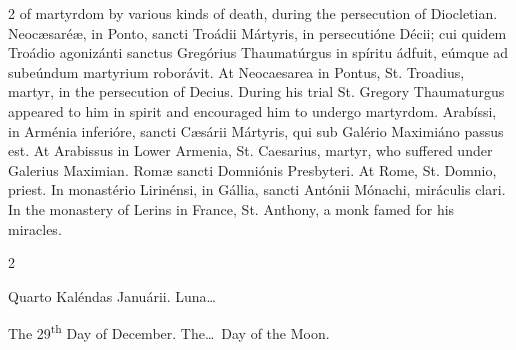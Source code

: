 \begin{paracol}{2}
 of martyrdom by various kinds of death, during the persecution of 
 Diocletian.
\switchcolumn*
{}
Neocæsaréæ, in Ponto, sancti Troádii Mártyris, 
 in persecutióne Décii; cui quidem Troádio agonizánti sanctus Gregórius 
 Thaumatúrgus in spíritu ádfuit, eúmque ad subeúndum martyrium 
 roborávit.
\switchcolumn
{}
At Neocaesarea in Pontus, St. Troadius, martyr, in the persecution of Decius. 
 During his trial St. Gregory Thaumaturgus appeared to him in spirit and 
 encouraged him to undergo martyrdom.
\switchcolumn*
{}
Arabíssi, in Arménia inferióre, sancti Cæsárii 
 Mártyris, qui sub Galério Maximiáno passus est.
\switchcolumn
{}
At Arabissus in Lower Armenia, St. Caesarius, martyr, who suffered under 
 Galerius Maximian.
\switchcolumn*
{}
Romæ sancti Domniónis Presbyteri.
\switchcolumn
{}
At Rome, St. Domnio, priest.
\switchcolumn*
{}
In monastério Lirinénsi, in Gállia, sancti Antónii Mónachi, miráculis clari.
\switchcolumn
{}
In the monastery of Lerins in France, St. Anthony, a monk famed for his 
 miracles.
\switchcolumn*
{}
\end{paracol}


\begin{paracol}{2}
\begin{center}{\color{gregoriocolor} Quarto Kaléndas Januárii. 
 Luna\dots\ }\end{center}
\switchcolumn
{}
\begin{center}{\color{gregoriocolor} The 
 29\textsuperscript{th} Day of 
 December. The\dots\ Day of the Moon.}\end{center}
\end{paracol}

